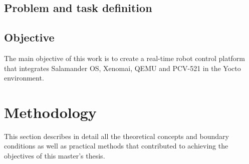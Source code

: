 \documentclass[MMR,Master,english]{twbook}
\begin{document}
\section{Problem and task definition}

\section{Objective}

The main objective of this work is to create a real-time robot control platform that integrates Salamander OS, Xenomai, QEMU and PCV-521 in the Yocto environment.


\clearpage

\chapter{Methodology}\label{cha:methodology}

This section describes in detail all the theoretical concepts and boundary conditions as well as practical methods that contributed to achieving the objectives of this master's thesis.
\end{document}

